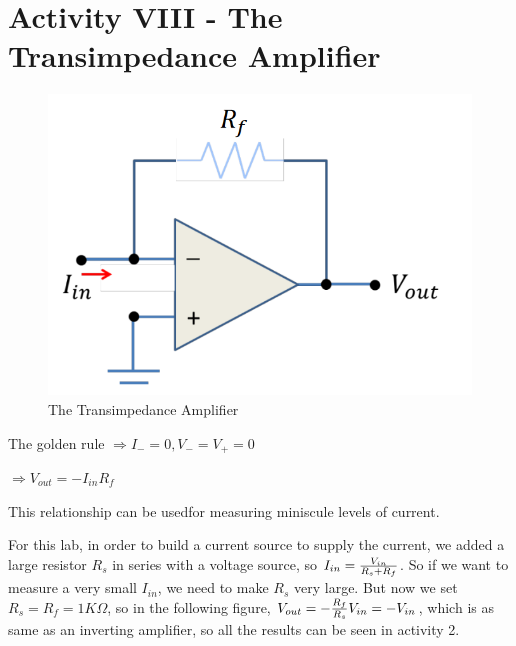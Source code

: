 \documentclass[11pt]{article}
\begin{document}
\section{Activity VIII - The Transimpedance Amplifier}

\begin{figure}[H]
 \begin{center}
  \includegraphics[width=\linewidth/1]{act8b}
  \caption{The Transimpedance Amplifier}
  \label{fig:act8b}
 \end{center}
\end{figure}

The golden rule $\Rightarrow I_{-}=0, V_{-}=V_{+}=0$

$\Rightarrow V_{out}=-I_{in}R_{f}$

This relationship can be usedfor measuring miniscule levels of current.

For this lab, in order to build a current source to supply the current, we added a large resistor $R_{s}$ in series with a voltage source, so $I_{in}={V_{in}\over R_{s}+R_{f}}$. So if we want to measure a very small $I_{in}$, we need to make $R_{s}$ very large. But now we set $R_{s}=R_{f}=1K\Omega $, so in the following figure, $V_{out}=-{R_{f}\over R_{s}}V_{in}=-V_{in}$, which is as same as an inverting amplifier, so all the results can be seen in activity 2.
\end{document}
